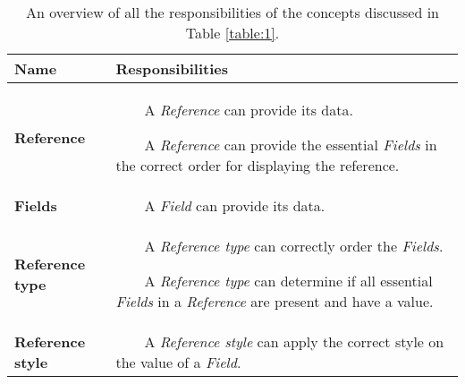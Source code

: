 \documentclass[a4paper]{article}
\newcommand{\tabitem}{~~\llap{\textbullet}~~}
\begin{document}
\begin{table}
	\centering
	\caption{An overview of all the responsibilities of the concepts discussed in Table \ref{table:1}.}
	\label{table:5}
	\begin{tabular}{|p{3cm}|p{8.5cm}|} \hline
		\textbf{Name} & \textbf{Responsibilities} \\ \hline
		
		\textbf{Reference} & 
			\tabitem A \textit{Reference} can provide its data.
			
			\tabitem A \textit{Reference} can provide the essential \textit{Fields} in the correct order for displaying the reference.\\ \hline
		
		\textbf{Fields} & 
			\tabitem A \textit{Field} can provide its data. \\ \hline
		
		\textbf{Reference type} & 
			\tabitem A \textit{Reference type} can correctly order the \textit{Fields}. 
			
			\tabitem A \textit{Reference type} can determine if all essential \textit{Fields} in a \textit{Reference} are present and have a value. \\ \hline
		
		\textbf{Reference style} &
			\tabitem A \textit{Reference style} can apply the correct style on the value of a \textit{Field}. \\ \hline
	\end{tabular}
\end{table}
\end{document}
